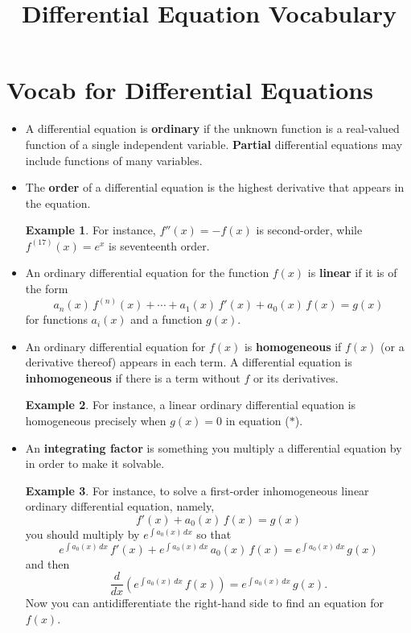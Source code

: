 \documentclass[12pt]{article}
\title{Differential Equation Vocabulary}
\theoremstyle{definition}
\newtheorem*{example}{Example}
\begin{document}
\section*{Vocab for Differential Equations}
\begin{itemize}
\item A differential equation is \textbf{ordinary} if the unknown function
is a real-valued function of a single independent variable.
\textbf{Partial} differential equations may include functions of many
variables.
\item The \textbf{order} of a differential equation is the highest
  derivative that appears in the equation.
\begin{example}For instance, $f''(x) =
  -f(x)$ is second-order, while $f^{(17)}(x) = e^x$ is seventeenth
  order.
\end{example}
\item An ordinary differential equation for the function $f(x)$ is
\textbf{linear} if it is of the form
\begin{equation*}
a_n(x) \, f^{(n)}(x) + \cdots +
a_1(x) \, f'(x) +
a_0(x) \, f(x) = g(x)
\tag{$\ast$}
\end{equation*}
for functions $a_i(x)$ and a function $g(x)$.
\item An ordinary differential equation for $f(x)$ is
  \textbf{homogeneous} if $f(x)$ (or a derivative thereof) appears in each
  term.  A differential equation is \textbf{inhomogeneous} if there is
  a term without $f$ or its derivatives.
\begin{example}For instance, a linear ordinary
  differential equation is homogeneous precisely when $g(x) = 0$ in
  equation ($\ast$).
\end{example}
\item An \textbf{integrating factor} is something you multiply a
  differential equation by in order to make it solvable.
\begin{example}
For instance, to solve a first-order inhomogeneous linear ordinary differential equation, namely,
$$
f'(x) + a_0(x) \, f(x) = g(x)
$$
you should multiply by $e^{\int a_0(x) \, dx}$ so that
$$
e^{\int a_0(x) \, dx}\, f'(x) + e^{\int a_0(x) \, dx} \, a_0(x) \, f(x) = e^{\int a_0(x) \, dx}\, g(x)
$$
and then
$$
\frac{d}{dx} \left( e^{\int a_0(x) \, dx}\, f(x) \right) = e^{\int a_0(x) \, dx}\, g(x).
$$
Now you can antidifferentiate the right-hand side to find an equation for $f(x)$.\end{example}
\end{itemize}

\subsection*{}
\end{document}

